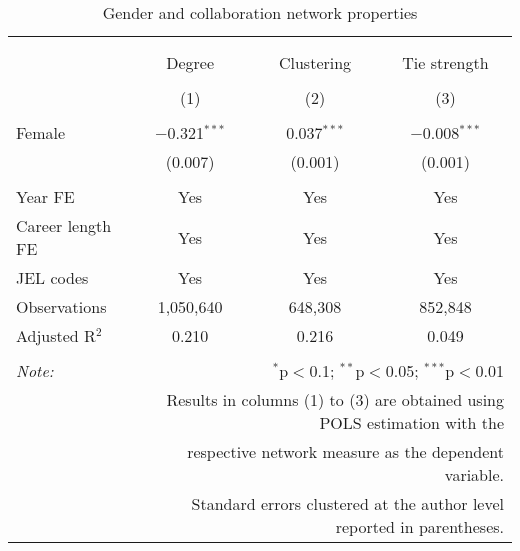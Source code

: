 
\begin{table}[!htbp] \centering 
  \caption{Gender and collaboration network properties} 
  \label{} 
\begin{tabular}{@{\extracolsep{2pt}}lccc} 
\\[-1.8ex]\hline 
\hline \\[-1.8ex] 
\\[-1.8ex] & Degree & Clustering & Tie strength \\ 
\\[-1.8ex] & (1) & (2) & (3)\\ 
\hline \\[-1.8ex] 
 Female & $-$0.321$^{***}$ & 0.037$^{***}$ & $-$0.008$^{***}$ \\ 
  & (0.007) & (0.001) & (0.001) \\ 
 \hline \\[-1.8ex] 
Year FE & Yes & Yes & Yes \\ 
Career length FE & Yes & Yes & Yes \\ 
JEL codes & Yes & Yes & Yes \\ 
Observations & 1,050,640 & 648,308 & 852,848 \\ 
Adjusted R$^{2}$ & 0.210 & 0.216 & 0.049 \\ 
\hline 
\hline \\[-1.8ex] 
\textit{Note:}  & \multicolumn{3}{r}{$^{*}$p$<$0.1; $^{**}$p$<$0.05; $^{***}$p$<$0.01} \\ 
 & \multicolumn{3}{r}{Results in columns (1) to (3) are obtained using POLS estimation with the} \\ 
 & \multicolumn{3}{r}{respective network measure as the dependent variable.} \\ 
 & \multicolumn{3}{r}{Standard errors clustered at the author level reported in parentheses.} \\ 
\end{tabular} 
\end{table} 
